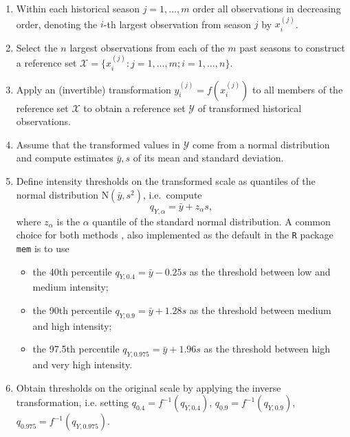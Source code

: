\documentclass{article}
\newcommand{\sd}{s}
\newcommand{\mean}{\bar{y}}
\begin{document}
\begin{enumerate}
\item Within each historical season $j = 1, \dots, m$ order all observations in decreasing order, denoting the $i$-th largest observation from season $j$ by $x^{(j)}_i$.
\item Select the $n$ largest observations from each of the $m$ past seasons to construct a reference set $\mathcal{X} = \{x_i^{(j)}: j = 1, \dots, m; i = 1, \dots, n\}$.
\item Apply an (invertible) transformation $y_i^{(j)} = f(x_i^{(j)})$ to all members of the reference set $\mathcal{X}$ to obtain a reference set $\mathcal{Y}$ of transformed historical observations.
\item Assume that the transformed values in $\mathcal{Y}$ come from a normal distribution and compute estimates $\mean, \sd$ of its mean and standard deviation.
\item Define intensity thresholds on the transformed scale as quantiles of the normal distribution N$(\mean, \sd^2)$, i.e.\ compute
\begin{equation}
q_{Y, \alpha} = \mean + z_\alpha \sd, \label{eq:def_q}
\end{equation}
where $z_\alpha$ is the $\alpha$ quantile of the standard normal distribution. A common choice for both methods \citep{WHO2017}, also implemented as the default in the \texttt{R} package \texttt{mem} \citep{Lozano2020} is to use
\begin{itemize}
\item the 40th percentile $q_{Y, 0.4} = \mean - 0.25 \sd$ as the threshold between low and medium intensity;
\item the 90th percentile $q_{Y, 0.9} = \mean + 1.28 \sd$ as the threshold between medium and high intensity;
\item the 97.5th percentile $q_{Y, 0.975} = \mean + 1.96\sd$ as the threshold between high and very high intensity.
\end{itemize}
\item Obtain thresholds on the original scale by applying the inverse transformation, i.e. setting $q_{0.4} = f^{-1}(q_{Y, 0.4})$, $q_{0.9} = f^{-1}(q_{Y, 0.9})$, $q_{0.975} = f^{-1}(q_{Y, 0.975})$.
\end{enumerate}
\end{document}
